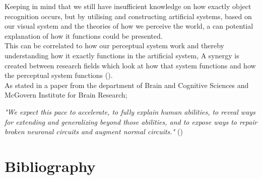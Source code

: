 \documentclass{article}
\newcommand{\goodcite}[1]{ {(\cite{#1})}}
\begin{document}
Keeping in mind that we still have insufficient knowledge on how exactly object recognition occurs, but by utilising and constructing artificial systems, based on our visual system and the theories of how we perceive the world, a can potential explanation of how it functions could be presented.\\
This can be correlated to how our perceptual system work and thereby understanding how it exactly functions in the artificial system, A synergy is created between research fields which look at how that system functions and how the perceptual system functions\goodcite{solveVisual}.\\As stated in a paper from the department of Brain and Cognitive Sciences and McGovern Institute for Brain Research;
\begin{center}
    \textit{"We expect this pace to accelerate, to fully explain human abilities, to reveal ways for extending and generalizing beyond those abilities, and to expose ways to repair broken neuronal circuits and augment normal circuits."}\goodcite{solveVisual}
\end{center}


\newpage
\section{Bibliography}
\label{sec:Bibliography}
\printbibliography
\end{document}
